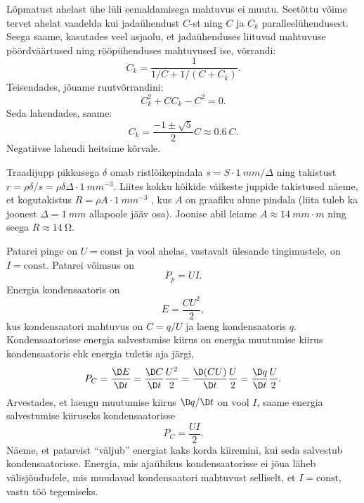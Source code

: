 \documentclass[10pt]{article}
\begin{document}
{%

\solu
Lõpmatust ahelast ühe lüli eemaldamisega mahtuvus ei muutu. Seetõttu võime tervet ahelat vaadelda kui jadaühendust $C$-st ning $C$ ja $C_k$ paralleelühendusest. Seega saame, kasutades veel asjaolu, et jadaühenduses liituvad mahtuvuse pöördväärtused ning rööpühenduses mahtuvused ise, võrrandi:
\[
C_{k}=\frac{1}{1 / C+1 /\left(C+C_{k}\right)}.
\]
Teisendades, jõuame ruutvõrrandini:
\[
C_{k}^{2}+C C_{k}-C^{2}=0.
\]
Seda lahendades, saame:
\[
C_{k}=\frac{-1 \pm \sqrt{5}}{2} C \approx \SI{0,6}{C}.
\]
Negatiivse lahendi heitsime kõrvale.
\probend
\bigskip


\solu
Traadijupp pikkusega $\delta$ omab ristlõikepindala $s = S \cdot \SI{1}{mm}/\Delta$ ning takistust $r = \rho \delta /s = \rho \delta \Delta \cdot \SI{1}{mm^{-3}}$. Liites kokku kõikide väikeste juppide takistused näeme, et kogutakistus $R = \rho A \cdot \SI{1}{mm^{-3}}$ , kus $A$ on graafiku alune pindala (liita tuleb ka joonest $\Delta = \SI{1}{mm}$ allapoole jääv osa). Joonise abil leiame $A \approx \SI{14}{mm\cdot m}$ ning seega $R \approx \SI{14}{\ohm}$.
\probend
\bigskip


\solu
Patarei pinge on $U=\text{const}$ ja vool ahelas, vastavalt ülesande tingimustele, on $I=\text{const}$. Patarei võimsus on
\[P_p=UI. \]
Energia kondensaatoris on
\[E=\frac{CU^2}{2}, \]
kus kondensaatori mahtuvus on $C=q/U$ ja laeng kondensaatoris $q$.
Kondensaatorisse energia salvestamise kiirus on energia muutumise kiirus kondensaatoris ehk energia tuletis aja järgi,
\[P_C=\frac{\D E}{\D t}=\frac{\D C}{\D t}\frac{U^2}{2}=\frac{\D (CU)}{\D t}\frac{U}{2}=\frac{\D q}{\D t}\frac{U}{2}.\]
Arvestades, et laengu muutumise kiirus $\D q/\D t$ on vool $I$, saame energia salvestumise kiiruseks kondensaatorisse
\[P_C=\frac{UI}{2}.\]
Näeme, et patareist \enquote{väljub} energiat kaks korda kiiremini, kui seda salvestub kondensaatorisse. Energia, mis ajaühikus kondensaatorisse ei jõua läheb välisjõududele, mis muudavad kondensaatori mahtuvust selliselt, et $I=\text{const}$, vastu töö tegemiseks.
\probend
\bigskip

}
\end{document}

